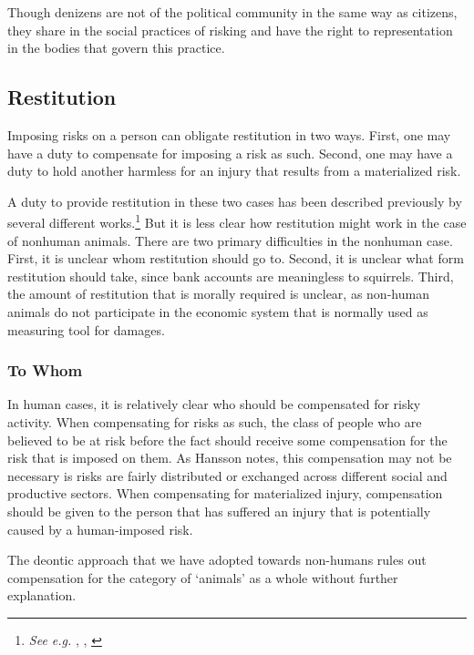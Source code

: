 Though denizens are not of the political community in the same way as citizens,
they share in the social practices of risking and have the right to
representation in the bodies that govern this practice.

\subsection{Restitution}

Imposing risks on a person can obligate restitution in two ways. First, one may
have a duty to compensate for imposing a risk as such. Second, one may have a
duty to hold another harmless for an injury that results from a materialized
risk.

A duty to provide restitution in these two cases has been described previously
by several different works.\footnote{\emph{See e.g.} \cite{hansson_risk},
\cite{frowe}, \cite{finkelstein}} But it is less clear how restitution might
work in the case of nonhuman animals. There are two primary difficulties in the
nonhuman case.  First, it is unclear whom restitution should go to. Second, it
is unclear what form restitution should take, since bank accounts are
meaningless to squirrels. Third, the amount of restitution that is morally
required is unclear, as non-human animals do not participate in the economic
system that is normally used as measuring tool for damages.


\subsubsection{To Whom}

In human cases, it is relatively clear who should be compensated for risky
activity. When compensating for risks as such, the class of people who are
believed to be at risk before the fact should receive some compensation for the
risk that is imposed on them. As Hansson notes, this compensation may not be
necessary is risks are fairly distributed or exchanged across different social
and productive sectors.\autocite[103]{hansson_risk} When compensating for
materialized injury, compensation should be given to the person that has
suffered an injury that is potentially caused by a human-imposed
risk.\autocite[112--113]{hansson_risk}


The deontic
approach that we have adopted towards non-humans rules out compensation for the
category of ‘animals’ as a whole without further explanation. 
